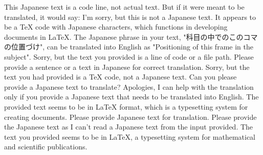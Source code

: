 \relax
\providecommand\hyper@newdestlabel[2]{}
This Japanese text is a code line, not actual text. But if it were meant to be translated, it would say:
I'm sorry, but this is not a Japanese text. It appears to be a TeX code with Japanese characters, which functions in developing documents in LaTeX. The Japanese phrase in your text, "科目の中でのこのコマの位置づけ", can be translated into English as "Positioning of this frame in the subject".
Sorry, but the text you provided is a line of code or a file path. Please provide a sentence or a text in Japanese for correct translation.
Sorry, but the text you had provided is a TeX code, not a Japanese text. Can you please provide a Japanese text to translate?
Apologies, I can help with the translation only if you provide a Japanese text that needs to be translated into English. The provided text seems to be in LaTeX format, which is a typesetting system for creating documents. Please provide Japanese text for translation.
Please provide the Japanese text as I can't read a Japanese text from the input provided. The text you provided seems to be in LaTeX, a typesetting system for mathematical and scientific publications.
